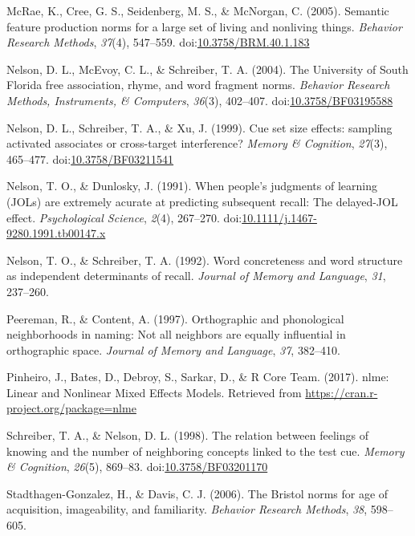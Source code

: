 \documentclass[english,man]{apa6}
\theoremstyle{definition}
\theoremstyle{definition}
\theoremstyle{definition}
\theoremstyle{remark}
\begin{document}
\hypertarget{ref-McRae2005}{}
McRae, K., Cree, G. S., Seidenberg, M. S., \& McNorgan, C. (2005).
Semantic feature production norms for a large set of living and
nonliving things. \emph{Behavior Research Methods}, \emph{37}(4),
547--559.
doi:\href{https://doi.org/10.3758/BRM.40.1.183}{10.3758/BRM.40.1.183}

\hypertarget{ref-Nelson2004}{}
Nelson, D. L., McEvoy, C. L., \& Schreiber, T. A. (2004). The University
of South Florida free association, rhyme, and word fragment norms.
\emph{Behavior Research Methods, Instruments, \& Computers},
\emph{36}(3), 402--407.
doi:\href{https://doi.org/10.3758/BF03195588}{10.3758/BF03195588}

\hypertarget{ref-Nelson1999}{}
Nelson, D. L., Schreiber, T. A., \& Xu, J. (1999). Cue set size effects:
sampling activated associates or cross-target interference? \emph{Memory
\& Cognition}, \emph{27}(3), 465--477.
doi:\href{https://doi.org/10.3758/BF03211541}{10.3758/BF03211541}

\hypertarget{ref-Nelson1991}{}
Nelson, T. O., \& Dunlosky, J. (1991). When people's judgments of
learning (JOLs) are extremely acurate at predicting subsequent recall:
The delayed-JOL effect. \emph{Psychological Science}, \emph{2}(4),
267--270.
doi:\href{https://doi.org/10.1111/j.1467-9280.1991.tb00147.x}{10.1111/j.1467-9280.1991.tb00147.x}

\hypertarget{ref-Nelson1992}{}
Nelson, T. O., \& Schreiber, T. A. (1992). Word concreteness and word
structure as independent determinants of recall. \emph{Journal of Memory
and Language}, \emph{31}, 237--260.

\hypertarget{ref-Peereman1997}{}
Peereman, R., \& Content, A. (1997). Orthographic and phonological
neighborhoods in naming: Not all neighbors are equally influential in
orthographic space. \emph{Journal of Memory and Language}, \emph{37},
382--410.

\hypertarget{ref-Pinheiro2017}{}
Pinheiro, J., Bates, D., Debroy, S., Sarkar, D., \& R Core Team. (2017).
nlme: Linear and Nonlinear Mixed Effects Models. Retrieved from
\url{https://cran.r-project.org/package=nlme}

\hypertarget{ref-Schreiber1998}{}
Schreiber, T. A., \& Nelson, D. L. (1998). The relation between feelings
of knowing and the number of neighboring concepts linked to the test
cue. \emph{Memory \& Cognition}, \emph{26}(5), 869--83.
doi:\href{https://doi.org/10.3758/BF03201170}{10.3758/BF03201170}

\hypertarget{ref-Stadthagen-Gonzalez2006}{}
Stadthagen-Gonzalez, H., \& Davis, C. J. (2006). The Bristol norms for
age of acquisition, imageability, and familiarity. \emph{Behavior
Research Methods}, \emph{38}, 598--605.
\end{document}
